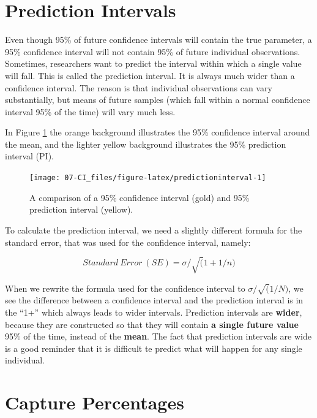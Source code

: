 \documentclass[
  oneside]{book}
\begin{document}
\hypertarget{prediction-intervals}{%
\section{Prediction Intervals}\label{prediction-intervals}}

Even though 95\% of future confidence intervals will contain the true parameter, a 95\% confidence interval will not contain 95\% of future individual observations. Sometimes, researchers want to predict the interval within which a single value will fall. This is called the prediction interval. It is always much wider than a confidence interval. The reason is that individual observations can vary substantially, but means of future samples (which fall within a normal confidence interval 95\% of the time) will vary much less.

In Figure \ref{fig:predictioninterval} the orange background illustrates the 95\% confidence interval around the mean, and the lighter yellow background illustrates the 95\% prediction interval (PI).



\begin{figure}

{\centering \texttt{[image: 07-CI\_files/figure-latex/predictioninterval-1]} 

}

\caption{A comparison of a 95\% confidence interval (gold) and 95\% prediction interval (yellow).}\label{fig:predictioninterval}
\end{figure}

To calculate the prediction interval, we need a slightly different formula for the standard error, that was used for the confidence interval, namely:

\[
Standard \ Error \ (SE) = \sigma/\sqrt(1+1/n)
\]

When we rewrite the formula used for the confidence interval to \(\sigma/\sqrt(1/N)\), we see the difference between a confidence interval and the prediction interval is in the ``1+'' which always leads to wider intervals. Prediction intervals are \textbf{wider}, because they are constructed so that they will contain \textbf{a single future value} 95\% of the time, instead of the \textbf{mean}. The fact that prediction intervals are wide is a good reminder that it is difficult te predict what will happen for any single individual.

\hypertarget{capture-percentages}{%
\section{Capture Percentages}\label{capture-percentages}}
\end{document}
